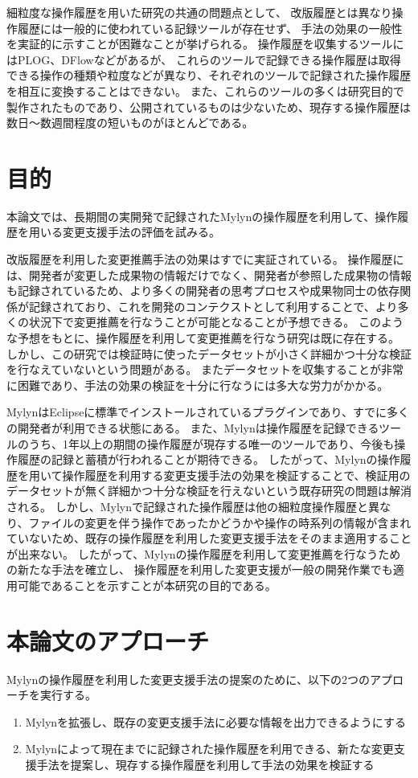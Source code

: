 \documentclass[a4paper]{jsbook}
\begin{document}
細粒度な操作履歴を用いた研究の共通の問題点として、
改版履歴とは異なり操作履歴には一般的に使われている記録ツールが存在せず、
手法の効果の一般性を実証的に示すことが困難なことが挙げられる。
操作履歴を収集するツールにはPLOG\cite{plog}、{\sc DFlow}\cite{minelli:2014}などがあるが、
これらのツールで記録できる操作履歴は取得できる操作の種類や粒度などが異なり、それぞれのツールで記録された操作履歴を相互に変換することはできない。
また、これらのツールの多くは研究目的で製作されたものであり、公開されているものは少ないため、現存する操作履歴は数日〜数週間程度の短いものがほとんどである。
\section{目的}
本論文では、長期間の実開発で記録されたMylynの操作履歴を利用して、操作履歴を用いる変更支援手法の評価を試みる。

改版履歴を利用した変更推薦手法の効果はすでに実証されている\cite{Zimmermann:2005}。
操作履歴には、開発者が変更した成果物の情報だけでなく、開発者が参照した成果物の情報も記録されているため、より多くの開発者の思考プロセスや成果物同士の依存関係が記録されており、これを開発のコンテクストとして利用することで、より多くの状況下で変更推薦を行なうことが可能となることが予想できる。
このような予想をもとに、操作履歴を利用して変更推薦を行なう研究は既に存在する\cite{6233415,KatoJapanese:2011,ss2012-76,ss2013-84,Yamamori:2016}。
しかし、この研究では検証時に使ったデータセットが小さく詳細かつ十分な検証を行なえていないという問題がある。
またデータセットを収集することが非常に困難であり、手法の効果の検証を十分に行なうには多大な労力がかかる。

Mylyn\cite{Kersten:2005}はEclipseに標準でインストールされているプラグインであり、すでに多くの開発者が利用できる状態にある。
また、Mylynは操作履歴を記録できるツールのうち、1年以上の期間の操作履歴が現存する唯一のツールであり、今後も操作履歴の記録と蓄積が行われることが期待できる。
したがって、Mylynの操作履歴を用いて操作履歴を利用する変更支援手法の効果を検証することで、検証用のデータセットが無く詳細かつ十分な検証を行えないという既存研究の問題は解消される。
しかし、Mylynで記録された操作履歴は他の細粒度操作履歴と異なり、ファイルの変更を伴う操作であったかどうかや操作の時系列の情報が含まれていないため、既存の操作履歴を利用した変更支援手法をそのまま適用することが出来ない。
したがって、Mylynの操作履歴を利用して変更推薦を行なうための新たな手法を確立し、
操作履歴を利用した変更支援が一般の開発作業でも適用可能であることを示すことが本研究の目的である。


\section{本論文のアプローチ}
Mylynの操作履歴を利用した変更支援手法の提案のために、以下の2つのアプローチを実行する。
\begin{enumerate}
  \item Mylynを拡張し、既存の変更支援手法に必要な情報を出力できるようにする
  \item Mylynによって現在までに記録された操作履歴を利用できる、新たな変更支援手法を提案し、現存する操作履歴を利用して手法の効果を検証する
\end{enumerate}
\end{document}
